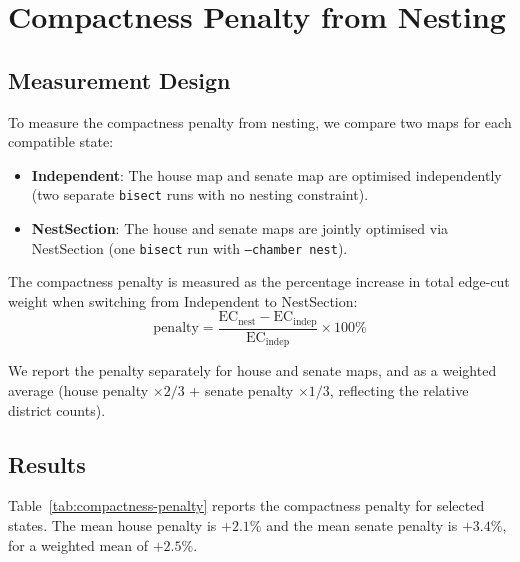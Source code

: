 \section{Compactness Penalty from Nesting}
\label{sec:penalty}

\subsection{Measurement Design}
\label{sec:penalty:design}

To measure the compactness penalty from nesting, we compare two maps for each
compatible state:
\begin{itemize}
  \item \textbf{Independent}: The house map and senate map are optimised
    independently (two separate \texttt{bisect} runs with no nesting constraint).
  \item \textbf{NestSection}: The house and senate maps are jointly optimised
    via NestSection (one \texttt{bisect} run with \texttt{--chamber nest}).
\end{itemize}

The compactness penalty is measured as the percentage increase in total
edge-cut weight when switching from Independent to NestSection:
\[
  \text{penalty} = \frac{\text{EC}_{\text{nest}} - \text{EC}_{\text{indep}}}{\text{EC}_{\text{indep}}} \times 100\%
\]

We report the penalty separately for house and senate maps, and as a
weighted average (house penalty $\times 2/3$ + senate penalty $\times 1/3$,
reflecting the relative district counts).

\subsection{Results}
\label{sec:penalty:results}

Table~\ref{tab:compactness-penalty} reports the compactness penalty for
selected states. The mean house penalty is $+2.1\%$ and the mean senate
penalty is $+3.4\%$, for a weighted mean of $+2.5\%$.

